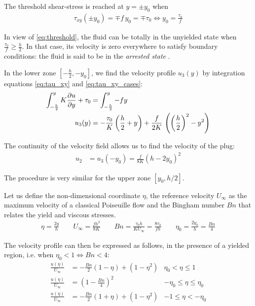 \documentclass[11 pt]{report}
\begin{document}
The threshold shear-stress is reached at $y=\pm y_0$ when 
\begin{align}
    \tau_{xy}(\pm y_0) = \mp f \, y_0 = \mp \tau_0 \iff y_0 = \frac{\tau_0}{f} \label{eq:threshold}
\end{align}

In view of \eqref{eq:threshold}, the fluid can be totally in the unyielded state when $\frac{\tau_0}{f} \geq \frac{h}{2}$. In that case, its velocity is zero everywhere to satisfy boundary conditions: the fluid is said to be in the \textit{arrested state} \cite{Saramito}.

In the lower zone $[-\frac{h}{2}, -y_0]$, we find the velocity profile $u_3(y)$ by integration equations \eqref{eq:tau_xy} and \eqref{eq:tau_xy_cases}:
\begin{align}
    \int_{-\frac{h}{2}}^y K \pdv{u}{y} + \tau_0 &= \int_{-\frac{h}{2}}^y -f y\\
    u_3(y) &= -\frac{\tau_0}{K} \left(\frac{h}{2}+y\right) + \frac{f}{2K} \, \left(\left(\frac{h}{2}\right)^2 - y^2\right)
\end{align}

The continuity of the velocity field allows us to find the velocity of the plug:
\begin{align}
    u_2 &= u_3(-y_0) = %
    \frac{f}{8K} \left(h - 2y_0\right)^2
\end{align}

The procedure is very similar for the upper zone $[y_0, h/2]$.

Let us define the non-dimensional coordinate $\eta$, the reference velocity $U_{\infty}$ as the maximum velocity of a classical Poiseuille flow and the Bingham number $Bn$ that relates the yield and viscous stresses.
\begin{align}
    \eta=\frac{2y}{h} \qquad U_{\infty}= \frac{f h^2}{8K} \qquad Bn=\frac{\tau_0 h}{K U_{\infty}}=\frac{8\tau_0}{f h} \qquad \eta_0 = \frac{2y_0}{h} = \frac{Bn}{4}
\end{align}

The velocity profile can then be expressed as follows, in the presence of a yielded region, i.e. when $\eta_0 < 1 \iff Bn < 4$:
\begin{align}
    \frac{u(\eta)}{U_{\infty}} &= -\frac{Bn}{2}(1-\eta) + (1-\eta^2) & \eta_0 < \eta \leq 1\\
    \frac{u(\eta)}{U_{\infty}} &= \left(1 - \frac{Bn}{4} \right)^2 & -\eta_0 \leq \eta \leq \eta_0 \\
    \frac{u(\eta)}{U_{\infty}} &= -\frac{Bn}{2}(1+\eta) + (1-\eta^2) & -1 \leq \eta < -\eta_0
\end{align}
\end{document}
